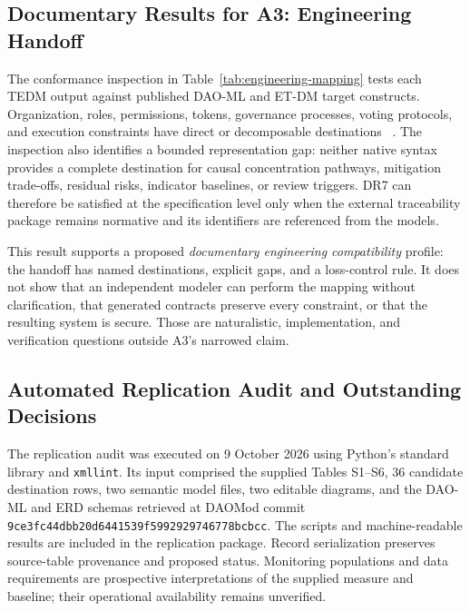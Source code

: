 \documentclass[referee,sn-basic]{sn-jnl}
\begin{document}
\subsection{Documentary Results for A3: Engineering Handoff}
\label{subsec:results-a3}

The conformance inspection in Table~\ref{tab:engineering-mapping} tests each TEDM
output against published DAO-ML and ET-DM target constructs. Organization,
roles, permissions, tokens, governance processes, voting protocols, and
execution constraints have direct or decomposable destinations
~\cite{Avanzo2024DAOML,Avanzo2025ExtendingTDM,Avanzo2026DAOMod}. The inspection
also identifies a bounded representation gap: neither native syntax provides a
complete destination for causal concentration pathways, mitigation trade-offs,
residual risks, indicator baselines, or review triggers. DR7 can therefore
be satisfied at the specification level only when the external traceability
package remains normative and its identifiers are referenced from the models.

This result supports a proposed \emph{documentary engineering compatibility} profile: the handoff
has named destinations, explicit gaps, and a loss-control rule. It does not show
that an independent modeler can perform the mapping without clarification, that
generated contracts preserve every constraint, or that the resulting system is
secure. Those are naturalistic, implementation, and verification questions
outside A3's narrowed claim.

\subsection{Automated Replication Audit and Outstanding Decisions}
\label{subsec:automated-audit}

The replication audit was executed on 9 October 2026 using Python's standard
library and \texttt{xmllint}. Its input comprised the supplied Tables S1--S6,
36 candidate destination rows, two semantic model files, two editable diagrams,
and the DAO-ML and ERD schemas retrieved at DAOMod commit
\texttt{9ce3fc44dbb20d6441539f5992929746778bcbcc}. The scripts and machine-readable
results are included in the replication package. Record serialization preserves
source-table provenance and proposed status. Monitoring populations and data
requirements are prospective interpretations of the supplied measure and
baseline; their operational availability remains unverified.
\end{document}
